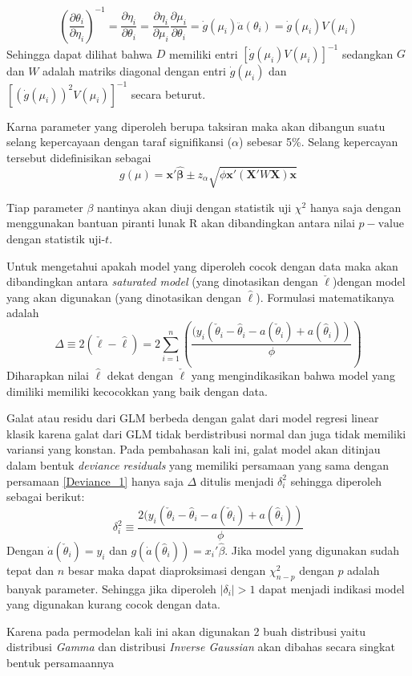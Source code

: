 \documentclass[12pt]{article}
\begin{document}
\begin{equation}
    \label{nguli}
    \left(\frac{\partial \theta_i}{\partial \eta_i}\right)^{-1} = \frac{\partial \eta_i}{\partial \theta_i} = \frac{\partial \eta_i}{\partial \mu_i}\frac{\partial \mu_i}{\partial \theta_i} = \dot{g}(\mu_i)\ddot{a}(\theta_i)=\dot{g}(\mu_i)V(\mu_i)
\end{equation}
Sehingga dapat dilihat bahwa $D$ memiliki entri $[\dot{g}(\mu_i)V(\mu_i)]^{-1}$
sedangkan $G$ dan $W$ adalah matriks diagonal dengan entri $\dot{g}(\mu_i)$ dan $[(\dot{g}(\mu_i))^2V(\mu_i)]^{-1}$  secara beturut. 
\par
Karna parameter yang diperoleh berupa taksiran maka akan dibangun suatu selang kepercayaan dengan taraf signifikansi ($\alpha$) sebesar 5\%. Selang kepercayan tersebut didefinisikan sebagai
\begin{equation}
    g(\mu) = \mathbf{x}'\mathbf{\hat{\beta}}\pm z_{\alpha}\sqrt{\phi \mathbf{x}' \left(\mathbf{X}'W\mathbf{X}\right)\mathbf{x}}
\end{equation}
\par 
Tiap parameter $\beta$ nantinya akan diuji dengan statistik uji $\chi^2$ hanya saja dengan menggunakan bantuan piranti lunak R akan dibandingkan antara nilai $p-\text{value}$ dengan statistik uji-$t$.   
\par 
Untuk mengetahui apakah model yang diperoleh cocok dengan data maka akan dibandingkan antara \textit{saturated model} (yang dinotasikan dengan $\check{\ell}$)dengan model yang akan digunakan (yang dinotasikan dengan $\hat{\ell}$). Formulasi matematikanya adalah 
\begin{equation}
    \label{Deviance_1}
    \Delta \equiv 2(\check{\ell}-\hat{\ell}) = 2\sum_{i=1}^n\left(\frac{(y_i(\check{\theta}_i-\hat{\theta}_i- a(\check{\theta}_i)+a(\hat{\theta}_i))}{\phi}\right)
\end{equation}
Diharapkan nilai $\hat{\ell}$ dekat dengan $\check{\ell}$ yang mengindikasikan bahwa model yang dimiliki memiliki kecocokkan yang baik dengan data.
\par
Galat atau residu dari GLM berbeda dengan galat dari model regresi linear klasik karena galat dari GLM tidak berdistribusi normal dan juga tidak memiliki variansi yang konstan. Pada pembahasan kali ini, galat model akan ditinjau dalam bentuk \textit{deviance residuals} yang memiliki persamaan yang sama dengan persamaan \ref{Deviance_1} hanya saja $\Delta$ ditulis menjadi $\delta^2_i$ sehingga diperoleh sebagai berikut:
\begin{equation}
    \label{deviance}
    \delta^2_i \equiv \frac{2(y_i(\check{\theta}_i-\hat{\theta}_i- a(\check{\theta}_i)+a(\hat{\theta}_i))} {\phi}
\end{equation}
Dengan $\dot{a}(\check{\theta}_i) = y_i$ dan $g(\dot{a}(\hat{\theta}_i)) = x_i'\hat{\beta}$. Jika model yang digunakan sudah tepat dan $n$ besar maka dapat diaproksimasi dengan $\chi^2_{n-p}$ dengan $p$ adalah banyak parameter. Sehingga jika diperoleh $|\delta_i|>1$ dapat menjadi indikasi model yang digunakan kurang cocok dengan data. 
\par 
Karena pada permodelan kali ini akan digunakan 2 buah distribusi yaitu distribusi \textit{Gamma} dan distribusi \textit{Inverse Gaussian} akan dibahas secara singkat bentuk persamaannya
\end{document}
